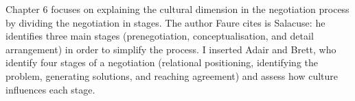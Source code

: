 \documentclass[../main.tex]{subfiles}
\begin{document}
Chapter 6 focuses on explaining the cultural dimension in the negotiation process
by dividing the negotiation in stages. 
The author Faure cites is Salacuse: he identifies three main stages (prenegotiation, conceptualisation, and detail arrangement) in order to simplify  the process.
I inserted Adair and Brett, who identify four stages of a negotiation (relational positioning, identifying the problem, generating solutions, and reaching agreement) and assess how culture influences each stage.





\end{document}
